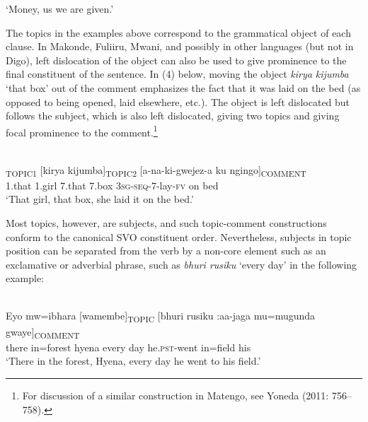 \documentclass[output=paper]{langsci/langscibook}
\begin{document}
\glt \textup{‘}\textup{Money, us we are given.’}
\z

The topics in the examples above correspond to the grammatical object of each clause. In Makonde, Fuliiru, Mwani, and possibly in other languages (but not in Digo), left dislocation of the object can also be used to give prominence to the final constituent of the sentence. In (4) below, moving the object \textit{kirya kijumba} ‘that box’ out of the comment emphasizes the fact that it was laid on the bed (as opposed to being opened, laid elsewhere, etc.). The object is left dislocated but follows the subject, which is also left dislocated, giving two topics and giving focal prominence to the comment.\footnote{For discussion of a similar construction in Matengo, see Yoneda (2011: 756–758).}

\ea\label{ex:}
\\
\textsubscript{TOPIC1} [kirya kijumba]\textsubscript{TOPIC2} [a-na-ki-gwejez-a ku ngingo]\textsubscript{COMMENT}\\
1.that 1.girl 7.that 7.box \textsc{3sg-seq}{}-7-lay-\textsc{fv }on bed\\


\glt \textup{‘}\textup{That girl, that box, she laid it on the bed.’}
\z

Most topics, however, are subjects, and such topic-comment constructions conform to the canonical SVO constituent order. Nevertheless, subjects in topic position can be separated from the verb by a non-core element such as an exclamative or adverbial phrase, such as \textit{bhuri rusiku} ‘every day’ in the following example:

\ea\label{ex:}
\\
\gll Eyo mw=ibhara [wamembe]\textsubscript{TOPIC} [bhuri rusiku :aa-jaga\footnotemark{}\textsuperscript{ }mu=mugunda gwaye]\textsubscript{COMMENT}\\
there in=forest hyena every  day he.\textsc{pst}{}-went in=field his{\rmfnm}\\


\glt \textup{‘}\textup{There in the forest, Hyena, every day he went to his field.’}
\z


\end{document}
